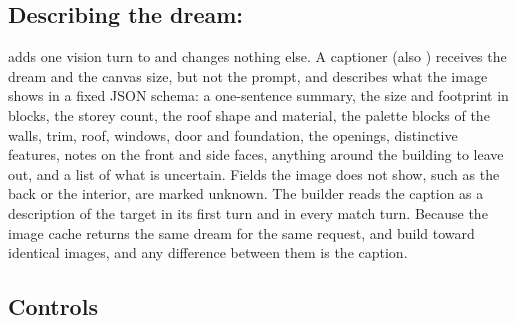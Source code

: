 \subsection{Describing the dream: \dreamcap{}}
\label{sec:caption}

\dreamcap{} adds one vision turn to \dream{} and changes nothing else. A captioner (also
\gptmini{}) receives the dream and the canvas size, but not the prompt, and describes what the
image shows in a fixed JSON schema: a one-sentence summary, the size and footprint in blocks, the
storey count, the roof shape and material, the palette blocks of the walls, trim, roof, windows,
door and foundation, the openings, distinctive features, notes on the front and side faces,
anything around the building to leave out, and a list of what is uncertain. Fields the image does
not show, such as the back or the interior, are marked unknown. The builder reads the caption as
a description of the target in its first turn and in every match turn. Because the image cache
returns the same dream for the same request, \dreamcap{} and \dream{} build toward identical
images, and any difference between them is the caption.

\subsection{Controls}
\label{sec:controls}

